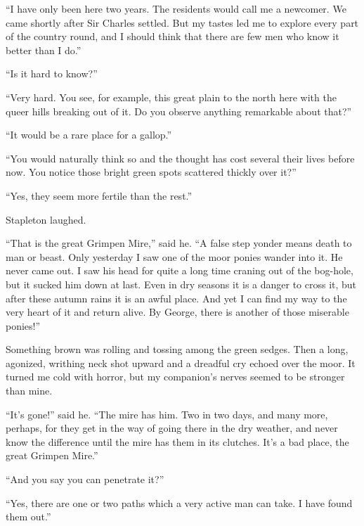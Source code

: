 \documentclass[paper=5.5in:8.5in,BCOR=7mm,twoside,DIV=calc,12pt,usegeometry,openany,chapterprefix,endperiod,headings=big]{scrbook} %
\begin{document}
\enquote{I have only been here two years. The residents would call me a newcomer. We came shortly after Sir Charles settled. But my tastes led me to explore every part of the country round, and I should think that there are few men who know it better than I do.}

\enquote{Is it hard to know?}

\enquote{Very hard. You see, for example, this great plain to the north here with the queer hills breaking out of it. Do you observe anything remarkable about that?}

\enquote{It would be a rare place for a gallop.}

\enquote{You would naturally think so and the thought has cost several their lives before now. You notice those bright green spots scattered thickly over it?}

\enquote{Yes, they seem more fertile than the rest.}

Stapleton laughed.

\enquote{That is the great Grimpen Mire,} said he. \enquote{A false step yonder means death to man or beast. Only yesterday I saw one of the moor ponies wander into it. He never came out. I saw his head for quite a long time craning out of the bog-hole, but it sucked him down at last. Even in dry seasons it is a danger to cross it, but after these autumn rains it is an awful place. And yet I can find my way to the very heart of it and return alive. By George, there is another of those miserable ponies!}

Something brown was rolling and tossing among the green sedges. Then a long, agonized, writhing neck shot upward and a dreadful cry echoed over the moor. It turned me cold with horror, but my companion's nerves seemed to be stronger than mine.

\enquote{It's gone!} said he. \enquote{The mire has him. Two in two days, and many more, perhaps, for they get in the way of going there in the dry weather, and never know the difference until the mire has them in its clutches. It's a bad place, the great Grimpen Mire.}

\enquote{And you say you can penetrate it?}

\enquote{Yes, there are one or two paths which a very active man can take. I have found them out.}

\end{document}
